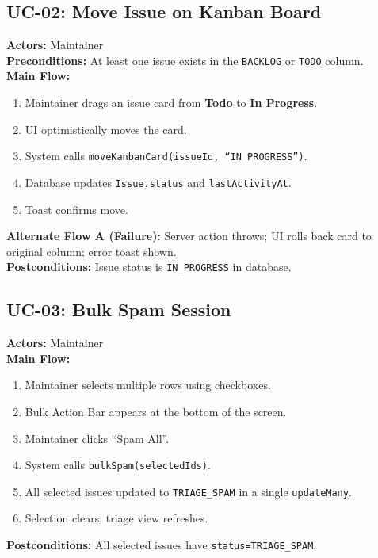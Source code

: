 \documentclass[12pt,a4paper]{report}
\begin{document}
\subsection{UC-02: Move Issue on Kanban Board}
\begin{tcolorbox}[colback=gray!5,colframe=accent,title=UC-02 --- Move Kanban Card]
\textbf{Actors:} Maintainer \\
\textbf{Preconditions:} At least one issue exists in the \texttt{BACKLOG} or \texttt{TODO} column. \\
\textbf{Main Flow:}
\begin{enumerate}
  \item Maintainer drags an issue card from \textbf{Todo} to \textbf{In Progress}.
  \item UI optimistically moves the card.
  \item System calls \texttt{moveKanbanCard(issueId, ``IN\_PROGRESS'')}.
  \item Database updates \texttt{Issue.status} and \texttt{lastActivityAt}.
  \item Toast confirms move.
\end{enumerate}
\textbf{Alternate Flow A (Failure):} Server action throws; UI rolls back card to original column; error toast shown. \\
\textbf{Postconditions:} Issue status is \texttt{IN\_PROGRESS} in database.
\end{tcolorbox}

\subsection{UC-03: Bulk Spam Session}
\begin{tcolorbox}[colback=gray!5,colframe=accent,title=UC-03 --- Bulk Spam]
\textbf{Actors:} Maintainer \\
\textbf{Main Flow:}
\begin{enumerate}
  \item Maintainer selects multiple rows using checkboxes.
  \item Bulk Action Bar appears at the bottom of the screen.
  \item Maintainer clicks ``Spam All''.
  \item System calls \texttt{bulkSpam(selectedIds)}.
  \item All selected issues updated to \texttt{TRIAGE\_SPAM} in a single \texttt{updateMany}.
  \item Selection clears; triage view refreshes.
\end{enumerate}
\textbf{Postconditions:} All selected issues have \texttt{status=TRIAGE\_SPAM}.
\end{tcolorbox}
\end{document}
